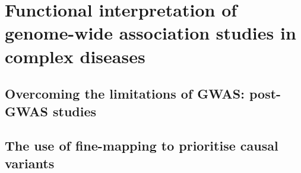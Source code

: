 \section{Functional interpretation of genome-wide association studies in complex diseases}
\subsection{Overcoming the limitations of GWAS: post-GWAS studies}
\subsection{The use of fine-mapping to prioritise causal variants}
%
%
%
%
%
%
%
